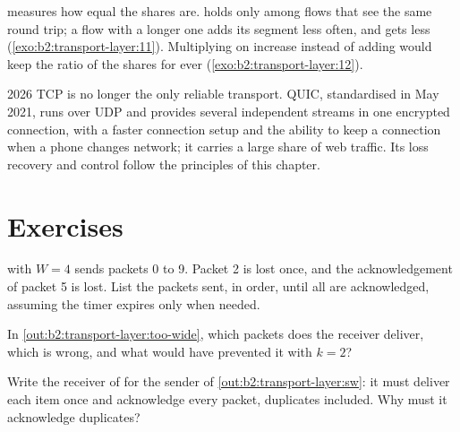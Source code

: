 \label{out:b2:transport-layer:fair}

 measures how equal the shares are.  holds only among flows that see the
same round trip; a flow with a longer one adds its segment less often, and gets less (\cref{exo:b2:transport-layer:11}).
Multiplying on increase instead of adding would keep the ratio of the shares for ever (\cref{exo:b2:transport-layer:12}).

\begin{dated}{2026}
TCP is no longer the only reliable transport. QUIC, standardised in May 2021, runs over UDP and provides several
independent streams in one encrypted connection, with a faster connection setup and the ability to keep a
connection when a phone changes network; it carries a large share of web traffic. Its loss recovery and 
control follow the principles of this chapter.
\end{dated}

\section{Exercises}\label{sec:b2:transport-layer:exercises}

\begin{exercise}[$\star$]\label{exo:b2:transport-layer:1}
 with $W = 4$ sends packets 0 to 9. Packet 2 is lost once, and the acknowledgement of packet 5 is lost. List
the packets sent, in order, until all are acknowledged, assuming the timer expires only when needed.
\end{exercise}

\begin{exercise}[$\star$]\label{exo:b2:transport-layer:2}
In \cref{out:b2:transport-layer:too-wide}, which packets does the receiver deliver, which is wrong, and what 
would have prevented it with $k = 2$?
\end{exercise}

\begin{exercise}[$\star$]\label{exo:b2:transport-layer:3}
Write the receiver of  for the sender of \cref{out:b2:transport-layer:sw}: it must deliver each item
once and acknowledge every packet, duplicates included. Why must it acknowledge duplicates?
\end{exercise}

